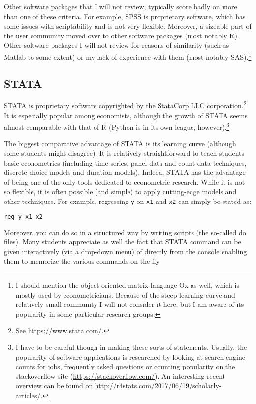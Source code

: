 \documentclass[fleqn,10pt]{SelfArx} %
\begin{document}
Other software packages that I will not review, typically score badly on more than one of these criteria. For example, SPSS is proprietary software, which has some issues with scriptability and is not very flexible. Moreover, a sizeable part of the user community moved over to other software packages (most notably R). Other software packages I will not review for reasons of similarity (such as Matlab to some extent) or my lack of experience with them (most notably SAS).\footnote{I should mention the object oriented matrix language Ox as well, which is mostly used by econometricians. Because of the steep learning curve and relatively small community I will not consider it here, but I am aware of its popularity in some particular research groups.}

\subsection*{STATA}

STATA is proprietary software copyrighted by the StataCorp LLC corporation.\footnote{See \href{https://www.stata.com}{https://www.stata.com/}.} It is especially popular among economists, although the growth of STATA seems almost comparable with that of R (Python is in its own league, however).\footnote{I have to be careful though in making these sorts of statements. Usually, the popularity of software applications is researched by looking at search engine counts for jobs, frequently asked questions or counting popularity on the stackoverflow site (\href{https://stackoverflow.com/}{https://stackoverflow.com/}). An interesting recent overview can be found on \href{http://r4stats.com/2017/06/19/scholarly-articles/}{http://r4stats.com/2017/06/19/scholarly-articles/}.}

The biggest comparative advantage of STATA is its learning curve (although some students might disagree). It is relatively straightforward to teach students basic econometrics (including time series, panel data and count data techniques, discrete choice models and duration models). Indeed, STATA has the advantage of being one of the only tools dedicated to econometric research. While it is not so flexible, it is often possible (and simple) to apply cutting-edge models and other techniques. For example, regressing \texttt{y} on \texttt{x1} and \texttt{x2} can simply be stated as:
\begin{lstlisting}[language=R]
reg y x1 x2
\end{lstlisting}
Moreover, you can do so in a structured way by writing scripts (the so-called do files). Many students appreciate as well the fact that STATA command can be given interactively (via a drop-down menu) of directly from the console enabling them to memorize the various commands on the fly. 
\end{document}
